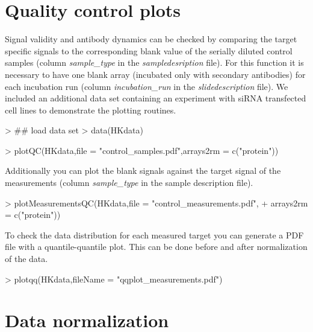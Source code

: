 \documentclass[12pt]{article}
\newcommand{\Rfunarg}[1]{{\textit{#1}}}
\begin{document}
\section{Quality control plots}

Signal validity and antibody dynamics can be checked by comparing the target specific signals to the corresponding blank value of the serially diluted control samples (column \Rfunarg{sample\_type} in the \emph{sampledesription} file).
 For this function it is necessary to have one blank array (incubated 
only with secondary antibodies) for each incubation run (column \Rfunarg{incubation\_run} in the 
\emph{slidedescription} file). We included an additional data set containing an
experiment with siRNA transfected cell lines to demonstrate the plotting routines.

\begin{Schunk}
\begin{Sinput}
> ## load data set
> data(HKdata)
\end{Sinput}
\end{Schunk}

\begin{Schunk}
\begin{Sinput}
> plotQC(HKdata,file = "control_samples.pdf",arrays2rm = c("protein"))
\end{Sinput}
\end{Schunk}

Additionally you can plot the blank signals against the target signal of the measurements
(column \Rfunarg{sample\_type} in the sample description file).

\begin{Schunk}
\begin{Sinput}
> plotMeasurementsQC(HKdata,file = "control_measurements.pdf",
+                    arrays2rm = c("protein"))
\end{Sinput}
\end{Schunk}

To check the data distribution for each measured target you can generate a PDF file
with a quantile-quantile plot. This can be done before and after normalization of the data.

\begin{Schunk}
\begin{Sinput}
> plotqq(HKdata,fileName = "qqplot_measurements.pdf")
\end{Sinput}
\end{Schunk}

\section{Data normalization}
\end{document}

